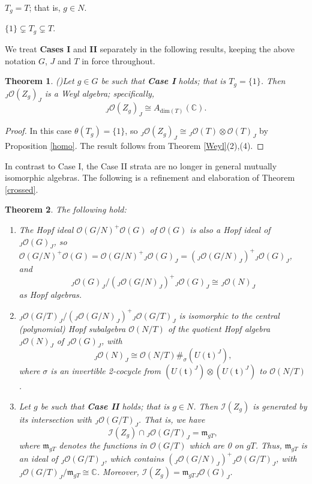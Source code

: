 \documentclass{amsart}
\numberwithin{equation}{section}
\newtheorem{theorem}{Theorem}[section]
\theoremstyle{definition}
\begin{document}
 $T_g = T$; that is, $g \in N$.
\medskip

 $\{1\} \subsetneq T_g \subsetneq T$.
\medskip

\noindent We treat {\bf Cases I} and {\bf II} separately in the following results, keeping the above notation $G$, $J$ and $T$ in force throughout.

\begin{theorem}{\rm (\cite[Remark 4.4]{G2})}\label{caseIstruc}
Let $g \in G$ be such that {\bf Case I} holds; that is $T_g = \{1\}$. Then ${}_J\mathcal{O}(Z_g)_J$ is a Weyl algebra; specifically, 
$$ {}_J\mathcal{O}(Z_g)_J\cong A_{\mathrm{dim}(T)}(\mathbb{C}). $$
\end{theorem}

\begin{proof} 
In this case $\theta (T_g) = \{1\}$, so ${}_J\mathcal{O}(Z_g)_J \cong {}_J\mathcal{O}(T) \otimes \mathcal{O}(T)_J$ by Proposition \ref{homo}. The result follows from Theorem \ref{Weyl}(2),(4).
\end{proof}
 
In contrast to Case I, the Case II strata are no longer in general mutually isomorphic algebras. The following is a refinement and elaboration of Theorem \ref{crossed}.

\begin{theorem}\label{caseIIstruc}
The following hold: 
\begin{enumerate}
\item The Hopf ideal $\mathcal{O}(G/N)^+\mathcal{O}(G)$ of $\mathcal{O}(G)$ is also a Hopf ideal of ${}_J\mathcal{O}(G)_J$, so $\mathcal{O}(G/N)^+\mathcal{O}(G) = \mathcal{O}(G/N)^+{}_J\mathcal{O}(G)_J = ({}_J\mathcal{O}(G/N)_J)^+{}_J\mathcal{O}(G)_J $, and  
$${}_J\mathcal{O}(G)_J/({}_J\mathcal{O}(G/N)_J)^+{}_J\mathcal{O}(G)_J \cong{}_J\mathcal{O}(N)_J$$
as Hopf algebras.
\item ${}_J\mathcal{O}(G/T)_J/({}_J\mathcal{O}(G/N)_J)^+{}_J\mathcal{O}(G/T)_J$ is isomorphic to the central (polynomial) Hopf subalgebra $\mathcal{O}(N/T)$ of the quotient Hopf algebra ${}_J\mathcal{O}(N)_J$ of ${}_J\mathcal{O}(G)_J$, with 
\begin{equation}\label{twister} {}_J\mathcal{O}(N)_J\cong \mathcal{O}(N/T)\#_{\sigma}\left(U(\mathfrak{t})^J\right),
\end{equation}
where $\sigma$ is an invertible 2-cocycle from $\left(U(\mathfrak{t})^J\right) \otimes \left(U(\mathfrak{t})^J\right)$ to $\mathcal{O}(N/T)$.
\item Let $g$ be such that {\bf Case II} holds; that is $g \in N$. Then $\mathcal{I}(Z_g)$ is generated by its intersection with ${}_J\mathcal{O}(G/T)_J$. That is, we have
$$\mathcal{I}(Z_g)\cap {}_J\mathcal{O}(G/T)_J = \mathfrak{m}_{gT},$$
where $\mathfrak{m}_{gT}$ denotes the functions in $\mathcal{O}(G/T)$ which are 0 on $gT$. Thus, $\mathfrak{m}_{gT}$ is an ideal of ${}_J\mathcal{O}(G/T)_J$, which contains $({}_J\mathcal{O}(G/N)_J)^+{}_J\mathcal{O}(G/T)_J$, with ${}_J\mathcal{O}(G/T)_J/\mathfrak{m}_{gT} \cong\mathbb{C}$. Moreover,
$\mathcal{I}(Z_g) =\mathfrak{m}_{gT}{}_J\mathcal{O}(G)_J$.
\end{enumerate} 
\end{theorem}
\end{document}

